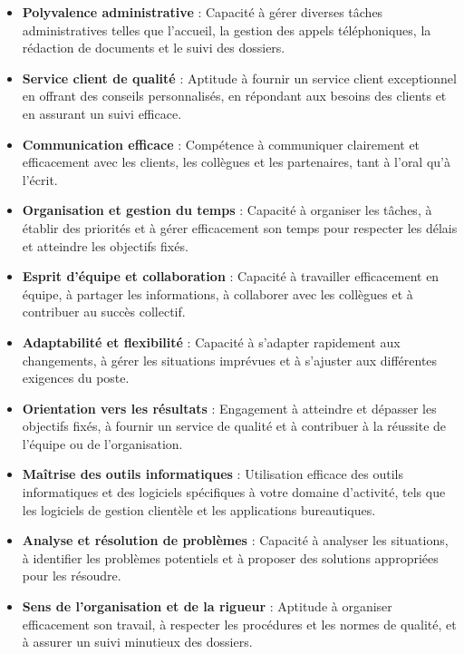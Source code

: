 \documentclass[11pt,a4paper,sans]{moderncv}
\begin{document}
\begin{itemize}[label=\textbullet, font=\LARGE \color{orange}]
  \item \textbf{Polyvalence administrative} : Capacité à gérer diverses tâches administratives telles que l'accueil, la gestion des appels téléphoniques, la rédaction de documents et le suivi des dossiers.
  \item \textbf{Service client de qualité} : Aptitude à fournir un service client exceptionnel en offrant des conseils personnalisés, en répondant aux besoins des clients et en assurant un suivi efficace.
  \item \textbf{Communication efficace} : Compétence à communiquer clairement et efficacement avec les clients, les collègues et les partenaires, tant à l'oral qu'à l'écrit.
  \item \textbf{Organisation et gestion du temps} : Capacité à organiser les tâches, à établir des priorités et à gérer efficacement son temps pour respecter les délais et atteindre les objectifs fixés.
  \item \textbf{Esprit d'équipe et collaboration} : Capacité à travailler efficacement en équipe, à partager les informations, à collaborer avec les collègues et à contribuer au succès collectif.
  \item \textbf{Adaptabilité et flexibilité} : Capacité à s'adapter rapidement aux changements, à gérer les situations imprévues et à s'ajuster aux différentes exigences du poste.
  \item \textbf{Orientation vers les résultats} : Engagement à atteindre et dépasser les objectifs fixés, à fournir un service de qualité et à contribuer à la réussite de l'équipe ou de l'organisation.
  \item \textbf{Maîtrise des outils informatiques} : Utilisation efficace des outils informatiques et des logiciels spécifiques à votre domaine d'activité, tels que les logiciels de gestion clientèle et les applications bureautiques.
  \item \textbf{Analyse et résolution de problèmes} : Capacité à analyser les situations, à identifier les problèmes potentiels et à proposer des solutions appropriées pour les résoudre.
  \item \textbf{Sens de l'organisation et de la rigueur} : Aptitude à organiser efficacement son travail, à respecter les procédures et les normes de qualité, et à assurer un suivi minutieux des dossiers.
\end{itemize}


\end{document}
